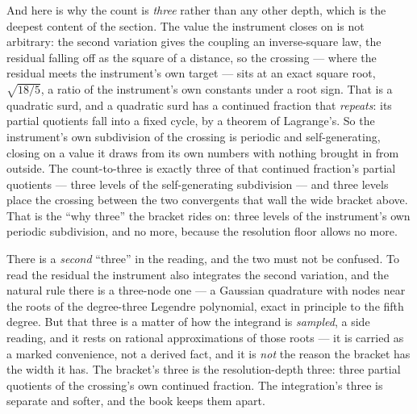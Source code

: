 And here is why the count is \emph{three} rather than any other depth, which is the deepest content of the section. The value
the instrument closes on is not arbitrary: the second variation gives the coupling an inverse-square law, the residual
falling off as the square of a distance, so the crossing --- where the residual meets the instrument's own target --- sits at
an exact square root, $\sqrt{18/5}$, a ratio of the instrument's own constants under a root sign. That is a quadratic surd,
and a quadratic surd has a continued fraction that \emph{repeats}: its partial quotients fall into a fixed cycle, by a
theorem of Lagrange's. So the instrument's own subdivision of the crossing is periodic and self-generating, closing on a
value it draws from its own numbers with nothing brought in from outside. The count-to-three is exactly three of that
continued fraction's partial quotients --- three levels of the self-generating subdivision --- and three levels place the
crossing between the two convergents that wall the wide bracket above. That is the ``why three'' the bracket rides on: three
levels of the instrument's own periodic subdivision, and no more, because the resolution floor allows no more.

There is a \emph{second} ``three'' in the reading, and the two must not be confused. To read the residual the instrument also
integrates the second variation, and the natural rule there is a three-node one --- a Gaussian quadrature with nodes near the
roots of the degree-three Legendre polynomial, exact in principle to the fifth degree. But that three is a matter of how the
integrand is \emph{sampled}, a side reading, and it rests on rational approximations of those roots --- it is carried as a
marked convenience, not a derived fact, and it is \emph{not} the reason the bracket has the width it has. The bracket's three
is the resolution-depth three: three partial quotients of the crossing's own continued fraction. The integration's three is
separate and softer, and the book keeps them apart.

